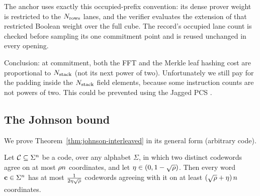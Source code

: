 The anchor uses exactly this occupied-prefix convention: its dense prover weight is restricted to the $N_{\mathrm{rows}}$ lanes, and the verifier evaluates the extension of that restricted Boolean weight over the full cube. The record's occupied lane count is checked before sampling its one commitment point and is reused unchanged in every opening.

Conclusion: at commitment, both the FFT and the Merkle leaf hashing cost are proportional to $N_{\mathrm{stack}}$ (not its next power of two). Unfortunately we still pay for the padding inside the $N_{\mathrm{stack}}$ field elements, because some instruction counts are not powers of two. This could be prevented using the Jagged PCS \cite{jagged_pcs}.


\subsection{The Johnson bound}\label{app:johnson}

We prove Theorem~\ref{thm:johnson-interleaved} in its general form (arbitrary code).

\begin{theorem}\label{thm:johnson-general}
Let $\mathcal{C} \subseteq \Sigma^n$ be a code, over any alphabet $\Sigma$, in which two distinct codewords agree on at most $\rho n$ coordinates, and let $\eta \in (0, 1 - \sqrt{\rho})$. Then every word $\mathbf{c} \in \Sigma^n$ has at most $\tfrac{1}{2\eta\sqrt{\rho}}$ codewords agreeing with it on at least $(\sqrt{\rho} + \eta)\, n$ coordinates.
\end{theorem}

